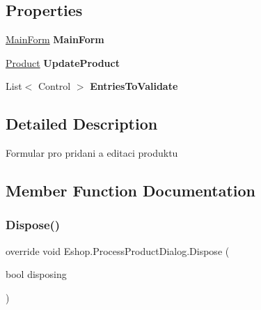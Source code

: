 \subsection*{Properties}
\begin{DoxyCompactItemize}
\item 
\mbox{\label{class_eshop_1_1_process_product_dialog_a5bfca7a9d3119c4b067dabc4f59ad1f4}} 
\mbox{\hyperlink{class_eshop_1_1_main_form}{Main\+Form}} {\bfseries Main\+Form}
\item 
\mbox{\label{class_eshop_1_1_process_product_dialog_ae37dc2ee13e56f7ab03407c4bb61a47d}} 
\mbox{\hyperlink{class_eshop_1_1_product}{Product}} {\bfseries Update\+Product}
\item 
\mbox{\label{class_eshop_1_1_process_product_dialog_abad97b58b4a6b0d3899cb2d80c739eb5}} 
List$<$ Control $>$ {\bfseries Entries\+To\+Validate}
\end{DoxyCompactItemize}


\subsection{Detailed Description}
Formular pro pridani a editaci produktu 



\subsection{Member Function Documentation}
\mbox{\label{class_eshop_1_1_process_product_dialog_a76f5995083af4714cc101c52d59b7e95}} 
\subsubsection{\texorpdfstring{Dispose()}{Dispose()}}
{\footnotesize\ttfamily override void Eshop.\+Process\+Product\+Dialog.\+Dispose (\begin{DoxyParamCaption}\item[{bool}]{disposing }\end{DoxyParamCaption})\hspace{0.3cm}{\ttfamily [protected]}}



